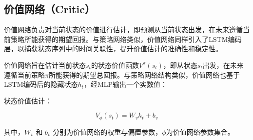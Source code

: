 \subsection{价值网络（Critic）}

价值网络负责对当前状态的价值进行估计，即预测从当前状态出发，在未来遵循当前策略所能获得的期望回报。与策略网络类似，价值网络同样引入了LSTM编码层，以捕获状态序列中的时间关联性，提升价值估计的准确性和稳定性。


价值网络旨在估计当前状态$s_{t}$的状态价值函数$V^{\pi}(s_{t})$，即从状态$s_{t}$出发，在未来遵循当前策略$\pi$所能获得的期望总回报。与策略网络结构类似，价值网络也基于LSTM编码后的隐藏状态$h_{t}$，经MLP输出一个实数值：


状态价值估计：

\begin{equation}
V_{\phi}(s_t) = W_v h_t + b_v
\end{equation}

其中，$W_v$ 和 $b_v$ 分别为价值网络的权重与偏置参数，${\phi}$为价值网络参数集合。




